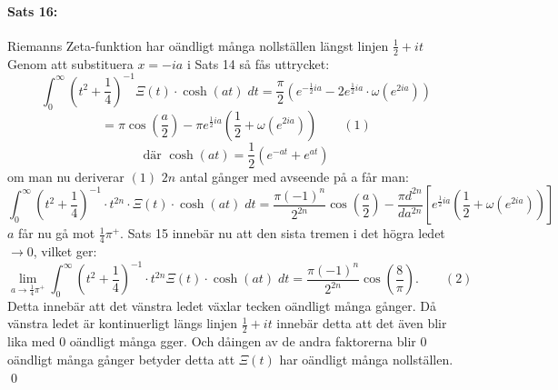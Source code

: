 \documentclass{article}%
\begin{document}
\paragraph{Sats 16:} Riemanns Zeta-funktion har oändligt många nollställen längst linjen $\frac 1 2 + it$
\\
Genom att substituera $x = -ia$ i Sats 14
så fås uttrycket:
\[
	\int_0^\infty (t^2 + \frac 1 4)^{-1} \Xi(t) \cdot \cosh(at) \; dt = \frac \pi 2 (e^{- \frac 1 2 ia} - 2 e^{\frac 1 2 ia}
		\cdot \omega(e^{2ia}))
\]
\[
	= \pi \cos(\frac a 2) - \pi e^{\frac 1 2 ia} (\frac 1 2 + \omega(e^{2 ia})) \qquad (1)
\]
\[
	\text{där } \cosh(at) = \frac 1 2 (e^{-at} + e^{at})
\]
om man nu deriverar $(1)$ $2n$ antal gånger med avseende på a får man:
\[
	\int_0^\infty (t^2 + \frac 1 4)^{-1} \cdot t^{2n} \cdot \Xi(t) \cdot \cosh(at) \; dt = \frac {\pi(-1)^n}{2^{2n}}
		\cos(\frac a 2) - \frac {\pi d^{2n}} {da^{2n}} \left [
			e^{\frac 1 2 ia} (\frac 1 2 + \omega(e^{2ia}))
		\right ]
\]
$a$ får nu gå mot $\frac 1 4 \pi^+$.
Sats 15 innebär nu att den sista tremen i det högra ledet $\to 0$, vilket ger:
\[
	\lim_{a \to \frac 1 4 \pi^+} \int_0^\infty (t^2 + \frac 1 4)^{-1} \cdot t^{2n}\Xi(t) \cdot \cosh(at) \; dt = 
		\frac {\pi (-1)^n} {2^{2n}} \cos(\frac 8 \pi). \qquad (2)
\]
Detta innebär att det vänstra ledet växlar tecken oändligt många gånger. Då vänstra ledet är kontinuerligt
längs linjen $\frac 1 2 + it$ innebär detta att det även blir lika med $0$ oändligt många gger.
Och dåingen av de andra faktorerna blir $0$ oändligt många gånger betyder detta att $\Xi(t)$ har oändligt många nollställen.\\
\hfill \qed
\end{document}
